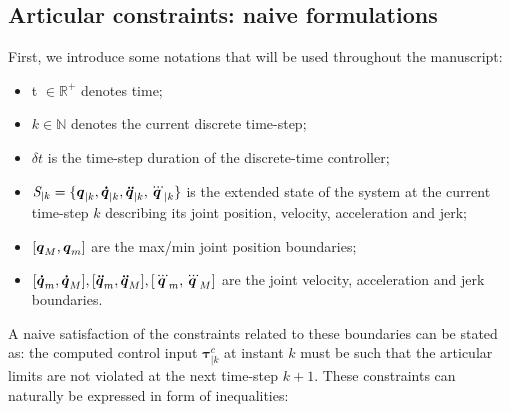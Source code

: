 \subsection{Articular constraints: naive formulations}
First, we introduce some notations that will be used throughout the manuscript:
\begin{itemize}
\item t $\in \mathbb{R}^{+}$ denotes time;
\item $k \in \mathbb{N}$ denotes the current discrete time-step;
\item $\delta t$ is the time-step duration of the discrete-time controller;
\item $\textit{S}_{|k}=\{\mbox{\boldmath${q}$}_{|k}, \mbox{\boldmath${\dot{q}}$}_{|k}, \mbox{\boldmath${\ddot{q}}$}_{|k}, \mbox{\boldmath${\dddot{q}}$}_{|k}\}$ is the extended state of the system at the current time-step $k$ describing its joint position, velocity, acceleration and jerk;
\item $[\mbox{\boldmath${q}$}_{M}, \mbox{\boldmath${q}$}_{m}]$ are the max/min joint position boundaries;
\item $[\mbox{\boldmath${\dot{q}}$}_{m}, \mbox{\boldmath${\dot{q}}$}_{M}], [\mbox{\boldmath${\ddot{q}}$}_{m}, \mbox{\boldmath${\ddot{q}}$}_{M}], [\mbox{\boldmath${\dddot{q}}$}_{m}, \mbox{\boldmath${\dddot{q}}$}_{M}]$ are the joint velocity, acceleration and jerk boundaries.
\end{itemize}
A naive satisfaction of the constraints related to these boundaries can be stated as: the computed control input $\boldsymbol{\tau}_{|k}^{c}$ at instant $k$ must be such that the articular limits are not violated at the next time-step $k+1$. These constraints can naturally be expressed in form of inequalities:
